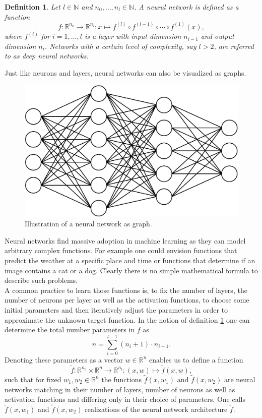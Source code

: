\documentclass[11pt, a4paper]{article}
\newtheorem{definition}[theorem]{Definition}
\newcommand{\N}{\mathbb{N}}
\newcommand{\R}{\mathbb{R}}
\begin{document}
\begin{definition} \label{def:network}
Let $l \in \N$ and $n_0, \dots, n_l \in \N$. A neural network is defined as a function
\[ f : \R^{n_0} \to \R^{n_l} : x \mapsto f^{(l)} \circ f^{(l-1)} \circ \cdots \circ f^{(1)} (x),\]
where $f^{(i)}$ for $i=1, \dots, l$ is a layer with input dimension $n_{i-1}$ and output dimension $n_i$. Networks with a certain level of complexity, say $l>2$, are referred to as deep neural networks.
\end{definition}

Just like neurons and layers, neural networks can also be visualized as graphs.

\begin{figure}[!h]
\centering
\includegraphics[width=0.6\linewidth]{images/network.png}
\caption{Illustration of a neural network as graph.}
\label{fig:neuron}
\end{figure}  

Neural networks find massive adoption in machine learning as they can model arbitrary complex functions. For example one could envision functions that predict the weather at a specific place and time or functions that determine if an image contains a cat or a dog. Clearly there is no simple mathematical formula to describe such problems. \\

A common practice to learn those functions is, to fix the number of layers, the number of neurons per layer as well as the activation functions, to choose some initial parameters and then iteratively adjust the parameters in order to approximate the unknown target function. In the notion of definition \ref{def:network} one can determine the total number parameters in $f$ as
\[ n = \sum_{i=0}^{l-1} (n_i + 1) \cdot n_{i+1}. \]
Denoting these parameters as a vector $w \in \R^n$ enables us to define a function
\[ \tilde{f} : \R^{n_0} \times \R^n \to \R^{n_l} : (x,w) \mapsto \tilde{f}(x,w), \]
such that for fixed $w_1, w_2 \in \R^n$ the functions $\tilde{f}(x,w_1)$ and $\tilde{f}(x,w_2)$ are neural networks matching in their number of layers, number of neurons as well as activation functions and differing only in their choice of parameters. One calls $\tilde{f}(x,w_1)$ and $\tilde{f}(x,w_2)$ realizations of the neural network architecture $\tilde{f}$. \\
\end{document}
